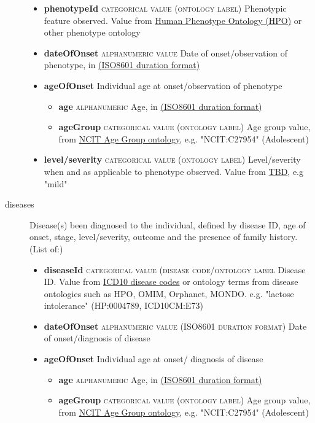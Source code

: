 \documentclass[a4paper, 10pt]{article}        %
\begin{document}
\begin{description}
	\begin{itemize}
			\item[] \textbf{phenotypeId} {\textsc{categorical value (ontology label)}} Phenotypic feature observed. Value from \href{link}{Human Phenotype Ontology (HPO)} or other phenotype ontology
			\item[] \textbf{dateOfOnset} {\textsc{alphanumeric value}} Date of onset/observation of phenotype, in \href{link}{(ISO8601 duration format)}  
			\item[] \textbf{ageOfOnset} Individual age at onset/observation of phenotype
			\begin{itemize}
			\item[] \textbf{age} {\textsc{alphanumeric}} Age, in \href{link}{(ISO8601 duration format)}  
			\item[] \textbf{ageGroup} {\textsc{categorical value (ontology label)}} Age group value, from \href{link}{NCIT Age Group ontology}, e.g. "NCIT:C27954" (Adolescent)
			\end{itemize}
			\item[] \textbf{level/severity}  {\textsc{categorical value (ontology label)}} Level/severity when and as applicable to phenotype observed. Value from \href{link}{TBD}, e.g "mild"
	\end{itemize}
	\item[diseases] Disease(s) been diagnosed to the individual, defined by disease ID, age of onset, stage, level/severity, outcome and the presence of family history. (List of:)
	\begin{itemize}
			\item[]  \textbf{diseaseId} {\textsc{categorical value (disease code/ontology label}} Disease ID. Value from \href{link}{ICD10 disease codes} or ontology terms from disease ontologies such as HPO, OMIM, Orphanet, MONDO. e.g. "lactose intolerance" (HP:0004789, ICD10CM:E73)
			\item[] \textbf{dateOfOnset} {\textsc{alphanumeric value (ISO8601 duration format)}} Date of onset/diagnosis of disease
			\item[]  \textbf{ageOfOnset} Individual age at onset/ diagnosis of disease
			\begin{itemize}
			\item[] \textbf{age} {\textsc{alphanumeric}} Age, in \href{link}{(ISO8601 duration format)}  
			\item[] \textbf{ageGroup} {\textsc{categorical value (ontology label)}} Age group value, from \href{link}{NCIT Age Group ontology}, e.g. "NCIT:C27954" (Adolescent)

\end{itemize}
\end{itemize}
\end{description}
\end{document}

